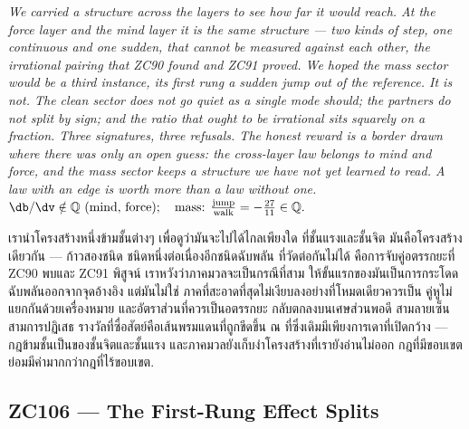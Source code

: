 \documentclass[12pt, a4paper]{article}
\begin{document}
\bigskip
\begin{center}
\textit{%
We carried a structure across the layers to see how far it would reach. At the
force layer and the mind layer it is the same structure --- two kinds of step, one
continuous and one sudden, that cannot be measured against each other, the
irrational pairing that ZC90 found and ZC91 proved. We hoped the mass sector
would be a third instance, its first rung a sudden jump out of the reference. It
is not. The clean sector does not go quiet as a single mode should; the partners
do not split by sign; and the ratio that ought to be irrational sits squarely on
a fraction. Three signatures, three refusals. The honest reward is a border drawn
where there was only an open guess: the cross-layer law belongs to mind and
force, and the mass sector keeps a structure we have not yet learned to read. A
law with an edge is worth more than a law without one.}\\[0.5em]
$\displaystyle
  \db/\dv\notin\mathbb{Q}\ \text{(mind, force)};\quad
  \text{mass: } \tfrac{\mathrm{jump}}{\mathrm{walk}}=-\tfrac{27}{11}\in\mathbb{Q}.$

\medskip
{\thaifont
เรานำโครงสร้างหนึ่งข้ามชั้นต่างๆ เพื่อดูว่ามันจะไปได้ไกลเพียงใด
ที่ชั้นแรงและชั้นจิต มันคือโครงสร้างเดียวกัน --- ก้าวสองชนิด ชนิดหนึ่งต่อเนื่องอีกชนิดฉับพลัน
ที่วัดต่อกันไม่ได้ คือการจับคู่อตรรกยะที่ ZC90 พบและ ZC91 พิสูจน์
เราหวังว่าภาคมวลจะเป็นกรณีที่สาม ให้ขั้นแรกของมันเป็นการกระโดดฉับพลันออกจากจุดอ้างอิง
แต่มันไม่ใช่ ภาคที่สะอาดที่สุดไม่เงียบลงอย่างที่โหมดเดียวควรเป็น คู่หูไม่แยกกันด้วยเครื่องหมาย
และอัตราส่วนที่ควรเป็นอตรรกยะ กลับตกลงบนเศษส่วนพอดี
สามลายเซ็น สามการปฏิเสธ
รางวัลที่ซื่อสัตย์คือเส้นพรมแดนที่ถูกขีดขึ้น ณ ที่ซึ่งเดิมมีเพียงการเดาที่เปิดกว้าง ---
กฎข้ามชั้นเป็นของชั้นจิตและชั้นแรง และภาคมวลยังเก็บงำโครงสร้างที่เรายังอ่านไม่ออก
กฎที่มีขอบเขต ย่อมมีค่ามากกว่ากฎที่ไร้ขอบเขต.}
\end{center}



\subsection{ZC106 --- The First-Rung Effect Splits}
\end{document}

